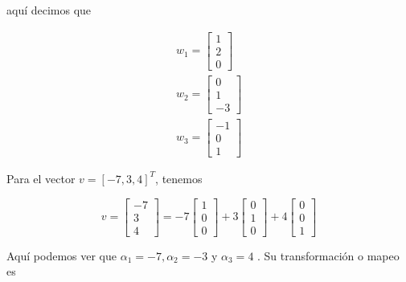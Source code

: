 aquí decimos que 

\begin{eqnarray*}
w_1 = \left[ \begin{array}{c}
    1 \\
    2 \\
    0 
\end{array}
\right] \\
w_2 = \left[ \begin{array}{c}
    0 \\
    1 \\
    -3 
\end{array}
\right] \\
w_3 = \left[ \begin{array}{c}
    -1 \\
    0 \\
    1 
\end{array}
\right]
\end{eqnarray*}


Para el vector $v = [-7,3,4]^T$, tenemos 

\begin{equation*}
 v = \left[ \begin{array}{c}
    -7 \\
    3 \\
    4 
\end{array}
\right] = -7 \left[ \begin{array}{c}
    1 \\
    0 \\
    0 
\end{array}
\right] + 3 \left[ \begin{array}{c}
    0 \\
    1 \\
    0 
\end{array}
\right] + 4 \left[ \begin{array}{c}
    0 \\
    0 \\
    1 
\end{array}
\right]
\end{equation*}

Aquí podemos ver que $\alpha_1 = -7, \alpha_2 = -3 $ y $\alpha_3 = 4$ . Su transformación o mapeo es 

